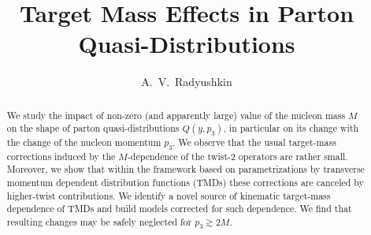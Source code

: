 \documentclass[final,5p,times,twocolumn]{elsarticle}
\begin{document}









\author{A.~V.~Radyushkin}
\address{Physics Department, Old Dominion University, Norfolk,
             VA 23529, USA}
\address{Thomas Jefferson National Accelerator Facility,
              Newport News, VA 23606, USA
}

   
                       
                        
\title{Target  Mass Effects in   Parton Quasi-Distributions }
                        
         
                        
\begin{abstract}



We study the impact  of   non-zero (and apparently  
large)  value of the nucleon mass $M$ on the shape of  parton quasi-distributions
 $Q(y,p_3)$, in particular on its  change with  the change of the 
nucleon momentum 
$p_3$. We observe  that the usual  target-mass corrections 
induced by the $M$-dependence of the twist-2 operators are 
rather small. Moreover, we show that within  the framework
based on parametrizations by  transverse momentum dependent 
distribution functions (TMDs) these corrections are 
canceled by  higher-twist contributions.
We identify a novel  source of kinematic target-mass dependence 
of TMDs and build models corrected for such  dependence.
We find that  resulting changes   may be safely neglected 
for $p_3 \gtrsim 2M$. 


              
\end{abstract}
      

\maketitle


\end{document}
